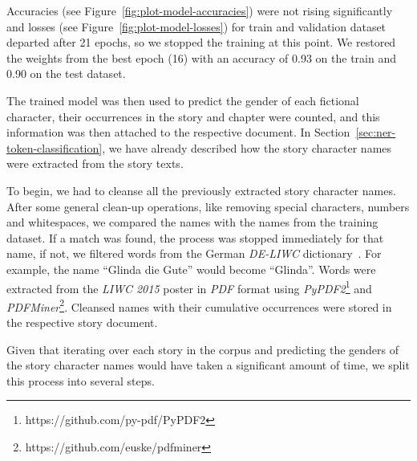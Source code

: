 
Accuracies (see Figure~\ref{fig:plot-model-accuracies}) were not rising significantly and losses (see Figure~\ref{fig:plot-model-losses}) for train and validation dataset departed after 21 epochs, so we stopped the training at this point.
We restored the weights from the best epoch (16) with an accuracy of 0.93 on the train and 0.90 on the test dataset.

The trained model was then used to predict the gender of each fictional character, their occurrences in the story and chapter were counted, and this information was then attached to the respective document.
In Section~\ref{sec:ner-token-classification}, we have already described how the story character names were extracted from the story texts.

To begin, we had to cleanse all the previously extracted story character names.
After some general clean-up operations, like removing special characters, numbers and whitespaces, we compared the names with the names from the training dataset.
If a match was found, the process was stopped immediately for that name, if not, we filtered words from the German \emph{DE-LIWC} dictionary~\citep{Meier2019LIWCDE-LIWC2015}.
For example, the name ``Glinda die Gute'' would become ``Glinda''.
Words were extracted from the \emph{LIWC 2015} poster in \emph{PDF} format using \emph{PyPDF2}\footnote{https://github.com/py-pdf/PyPDF2} and \emph{PDFMiner}\footnote{https://github.com/euske/pdfminer}.
Cleansed names with their cumulative occurrences were stored in the respective story document.

Given that iterating over each story in the corpus and predicting the genders of the story character names would have taken a significant amount of time, we split this process into several steps.

